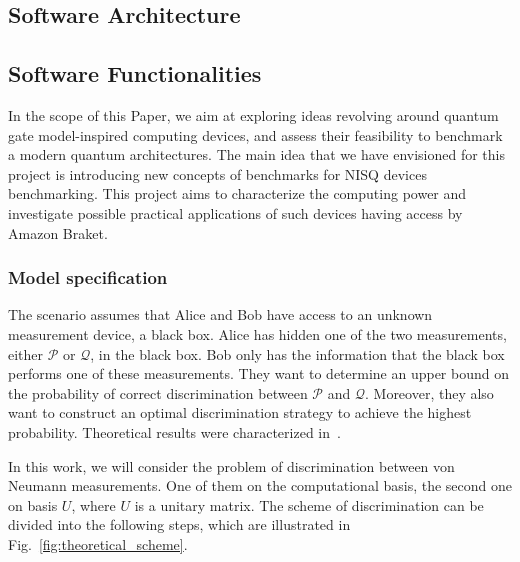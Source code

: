 \documentclass[preprint,12pt, a4paper]{elsarticle}
\newcommand{\1}{{\rm 1\hspace{-0.9mm}l}}
\newcommand{\PP}{\mathcal{P}}
\begin{document}
\subsection{Software Architecture}\label{sec:sortware-architecture}
\label{}


\subsection{Software Functionalities}\label{sec:sortware-functionalities}

In the scope of this Paper, we aim at  exploring ideas revolving around quantum 
gate model-inspired computing devices, and assess their feasibility to 
benchmark a modern quantum architectures. The main idea that we have envisioned 
for this project is  introducing new concepts of benchmarks for NISQ devices 
benchmarking. This project aims to characterize the computing power and 
investigate possible practical applications of such devices having access by 
Amazon Braket. 





\subsubsection{Model specification}
The scenario assumes that Alice and Bob have access to an unknown measurement
device, a black box. Alice has hidden one of the two measurements, either $\PP$
or $\mathcal{Q}$, in the black box. Bob only has the information that the black box
performs one of these measurements. They want to determine an upper bound on the
probability of correct discrimination between $\PP$ and $\mathcal{Q}$. Moreover, they also want to
construct an optimal discrimination strategy to achieve the highest probability. Theoretical results were characterized in~\cite{puchala2018strategies}.



In this work, we will consider the problem of discrimination between von Neumann 
measurements. One of them on the computational basis, the second one on basis 
$U$, where $U$ is a unitary matrix. 
The scheme of discrimination can be divided into the following steps, which are 
illustrated in Fig.~\ref{fig:theoretical_scheme}.
\end{document}
